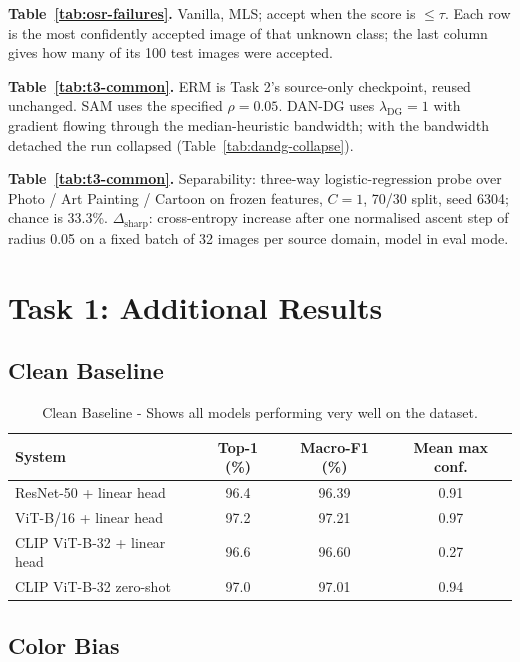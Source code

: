 \documentclass{article}
\begin{document}
\textbf{Table~\ref{tab:osr-failures}.} Vanilla, MLS; accept when the score is $\le\tau$. Each row is the most confidently
  accepted image of that unknown class; the last column gives how many of its 100 test images
  were accepted.

\textbf{Table~\ref{tab:t3-common}.} ERM is Task 2's source-only checkpoint, reused unchanged. SAM uses the specified
  $\rho=0.05$. DAN-DG uses $\lambda_{\mathrm{DG}}=1$ with gradient flowing through the
  median-heuristic bandwidth; with the bandwidth detached the run collapsed
  (Table~\ref{tab:dandg-collapse}).

\textbf{Table~\ref{tab:t3-common}.} Separability: three-way logistic-regression probe over Photo / Art Painting /
  Cartoon on frozen features, $C=1$, 70/30 split, seed 6304; chance is 33.3\%.
  $\Delta_{\mathrm{sharp}}$: cross-entropy increase after one normalised ascent step of radius 0.05
  on a fixed batch of 32 images per source domain, model in eval mode.

\section{Task 1: Additional Results}

\subsection{Clean Baseline}

\begin{table}[H]
  \caption{Clean Baseline - Shows all models performing very well on the dataset.}
  \label{tab:clean-baseline}
  \centering
  \begin{tabular}{lccc}
    \toprule
    System & Top-1 (\%) & Macro-F1 (\%) & Mean max conf. \\
    \midrule
    ResNet-50 + linear head   & 96.4 & 96.39 & 0.91 \\
    ViT-B/16 + linear head    & 97.2 & 97.21 & 0.97 \\
    CLIP ViT-B-32 + linear head & 96.6 & 96.60 & 0.27 \\
    CLIP ViT-B-32 zero-shot   & 97.0 & 97.01 & 0.94 \\
    \bottomrule
  \end{tabular}
\end{table}

\subsection{Color Bias}
\end{document}
